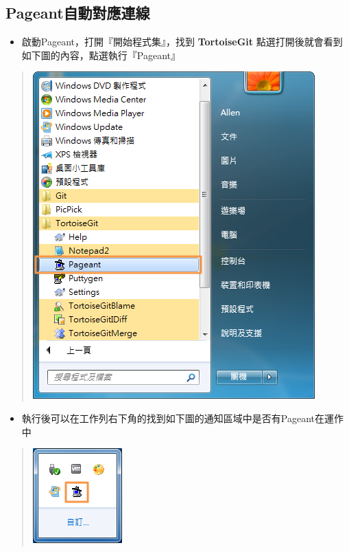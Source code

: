 \documentclass[letterpaper,10pt,english]{sphinxmanual}
\begin{document}
\subsection{Pageant自動對應連線}
\label{_doc/writing/index:pageant}\begin{itemize}
\item {} 
啟動Pageant，打開『開始程式集』，找到 \textbf{TortoiseGit} 點選打開後就會看到如下圖的內容，點選執行『Pageant』

\end{itemize}
\begin{quote}

\includegraphics{pageant-001.png}
\end{quote}
\begin{itemize}
\item {} 
執行後可以在工作列右下角的找到如下圖的通知區域中是否有Pageant在運作中

\end{itemize}
\begin{quote}

\includegraphics{pageant-002.png}
\end{quote}
\end{document}
